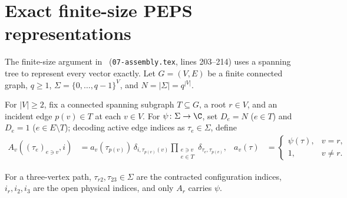 \section{Exact finite-size PEPS representations}
\label{sec:peps_exact_tree}

The finite-size argument in~\cite[Section~8]{OpenAI2026PolynomialPEPS}
(\texttt{07-assembly.tex}, lines 203--214) uses a spanning tree to represent
every vector exactly. Let $G=(V,E)$ be a finite connected graph, $q\ge 1$,
$\Sigma=\{0,\ldots,q-1\}^{V}$, and $N=|\Sigma|=q^{|V|}$.

\begin{definition}
    \label{def:peps_configuration_copy}
    \leanok
    For $|V|\ge2$, fix a connected spanning subgraph $T\subseteq G$, a root
    $r\in V$, and an incident edge $p(v)\in T$ at each $v\in V$. For
    $\psi\colon\Sigma\to\C$, set $D_e=N$ ($e\in T$) and $D_e=1$
    ($e\in E\setminus T$); decoding active edge indices as
    $\tau_e\in\Sigma$, define
    \begin{align}
        A_v((\tau_e)_{e\ni v},i)
         & = a_v(\tau_{p(v)})\,
        \delta_{i,\tau_{p(v)}(v)}
        \prod_{\substack{e\ni v     \\e\in T}}
        \delta_{\tau_e,\tau_{p(v)}},
         & a_v(\tau)            & =
        \begin{cases}\psi(\tau),&v=r,\\1,&v\ne r.\end{cases}
        \label{eq:peps_configuration_copy}
    \end{align}
\end{definition}


For a three-vertex path, $\tau_{r2},\tau_{23}\in\Sigma$ are the contracted
configuration indices, $i_r,i_2,i_3$ are the open physical indices, and only
$A_r$ carries $\psi$.


